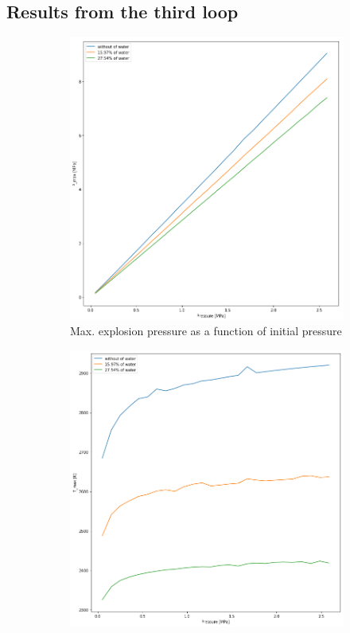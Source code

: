 \documentclass[a4paper]{article}
\begin{document}
\subsection{Results from the third loop}

\begin{figure}[H]
    \centering
    \begin{subfigure}[h]{0.4\textwidth}
        \includegraphics[width=\textwidth]{3_Pmax_to_P.png}
        	\caption{Max. explosion pressure as a function of initial pressure}
        \label{fig:3_1}
    \end{subfigure}
    \qquad
    \begin{subfigure}[h]{0.4\textwidth}
        \includegraphics[width=\textwidth]{3_Tmax_to_P.png}

\end{subfigure}
\end{figure}
\end{document}
